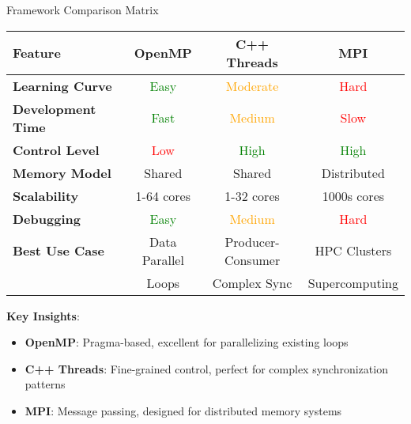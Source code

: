 \begin{frame}{ Framework Comparison Matrix}
	\begin{table}[h]
		\centering
		\scriptsize
		\begin{tabular}{|l|c|c|c|}
			\hline
			\textbf{Feature}         & \textbf{OpenMP} & \textbf{C++ Threads} & \textbf{MPI} \\
			\hline
			\textbf{Learning Curve}  & \textcolor{green}{Easy}    & \textcolor{orange}{Moderate}     & \textcolor{red}{Hard} \\
			\textbf{Development Time}& \textcolor{green}{Fast}    & \textcolor{orange}{Medium}       & \textcolor{red}{Slow} \\
			\textbf{Control Level}   & \textcolor{red}{Low}       & \textcolor{green}{High}          & \textcolor{green}{High} \\
			\textbf{Memory Model}    & Shared          & Shared               & Distributed \\
			\textbf{Scalability}     & 1-64 cores      & 1-32 cores           & 1000s cores \\
			\textbf{Debugging}       & \textcolor{green}{Easy}    & \textcolor{orange}{Medium}       & \textcolor{red}{Hard} \\
			\hline
			\textbf{Best Use Case}   & Data Parallel   & Producer-Consumer    & HPC Clusters \\
			                         & Loops           & Complex Sync         & Supercomputing \\
			\hline
		\end{tabular}
	\end{table}

	\vspace{1em}
	\textbf{Key Insights}:
	\begin{itemize}
		\item \textbf{OpenMP}: Pragma-based, excellent for parallelizing existing loops
		\item \textbf{C++ Threads}: Fine-grained control, perfect for complex synchronization patterns
		\item \textbf{MPI}: Message passing, designed for distributed memory systems
	\end{itemize}
\end{frame}

